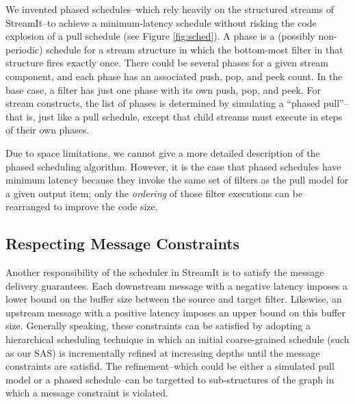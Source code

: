We invented phased schedules--which rely heavily on the structured
streams of StreamIt--to achieve a minimum-latency schedule without
risking the code explosion of a pull schedule (see Figure
\ref{fig:sched}).  A phase is a (possibly non-periodic) schedule for a
stream structure in which the bottom-most filter in that structure
fires exactly once.  There could be several phases for a given stream
component, and each phase has an associated push, pop, and peek count.
In the base case, a filter has just one phase with its own push, pop,
and peek.  For stream constructs, the list of phases is determined by
simulating a ``phased pull''--that is, just like a pull schedule,
except that child streams must execute in steps of their own phases.

Due to space limitations, we cannot give a more detailed description
of the phased scheduling algorithm.  However, it is the case that
phased schedules have minimum latency because they invoke the same set
of filters as the pull model for a given output item; only the {\it
ordering} of those filter executions can be rearranged to improve the
code size.

\subsection{Respecting Message Constraints}

Another responsibility of the scheduler in StreamIt is to satisfy the
message delivery guarantees.  Each downstream message with a negative
latency imposes a lower bound on the buffer size between the source
and target filter.  Likewise, an upstream message with a positive
latency imposes an upper bound on this buffer size.  Generally
speaking, these constraints can be satisfied by adopting a
hierarchical scheduling technique in which an initial coarse-grained
schedule (such as our SAS) is incrementally refined at increasing
depths until the message constraints are satisfid.  The
refinement--which could be either a simulated pull model or a phased
schedule--can be targetted to sub-structures of the graph in which a
message constraint is violated.
